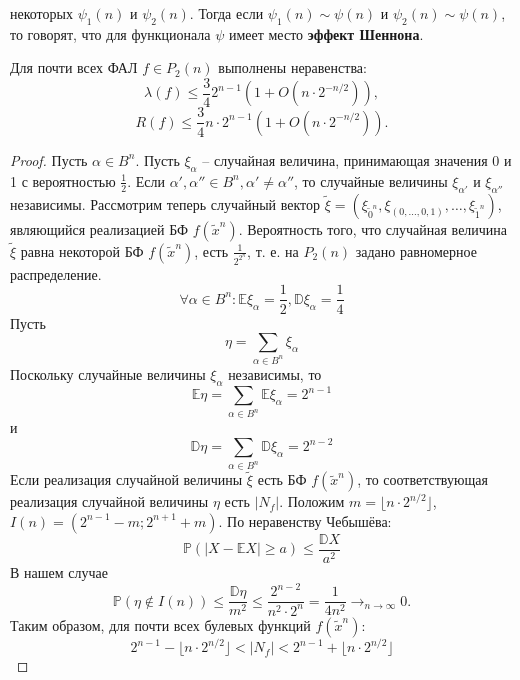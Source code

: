 \documentclass[11pt]{article}
\newcounter{th}\setcounter{th}{0}
\newcounter{stnmt}\setcounter{stnmt}{0}
\def\st{\par\smallskip\refstepcounter{stnmt}\textbf{\arabic{stnmt}}}
\newtheorem*{Statement}{Утверждение \st}
\begin{document}
некоторых $\psi_1(n)$ и $\psi_2(n)$. Тогда если $\psi_1(n) \sim \psi(n)$ и
$\psi_2(n) \sim \psi(n)$, то говорят, что для функционала $\psi$ имеет место \textbf{эффект Шеннона}.
\begin{Statement}
Для почти всех ФАЛ $f \in P_2(n)$ выполнены неравенства:
\begin{equation*}
\lambda(f) \leq \frac342^{n - 1}(1 + O(n\cdot2^{-n/2})),
\end{equation*}
\begin{equation*}
R(f) \leq \frac34n\cdot2^{n - 1}(1 + O(n\cdot2^{-n/2})).
\end{equation*}
\end{Statement}
\begin{proof}
Пусть $\alpha \in B^n$. Пусть $\xi_{\alpha}$ -- случайная величина, принимающая значения 0 и 1 с
вероятностью $\frac12$. Если $\alpha', \alpha'' \in B^n, \alpha' \neq \alpha''$, то случайные
величины $\xi_{\alpha'}$ и $\xi_{\alpha''}$ независимы. Рассмотрим теперь случайный вектор
$\tilde{\xi} = (\xi_{\tilde{0}^n}, \xi_{(0, \ldots, 0, 1)}, \ldots, \xi_{\tilde{1}^n})$,
являющийся реализацией БФ $f(\tilde{x}^n)$. Вероятность того, что случайная величина $\tilde{\xi}$
равна некоторой БФ $f(\tilde{x}^n)$, есть $\frac1{2^{2^n}}$, т. е. на $P_2(n)$ задано равномерное
распределение.
\begin{equation*}
\forall \alpha \in B^n: \mathbb{E}\xi_{\alpha} = \frac12, \mathbb{D}\xi_{\alpha} = \frac14
\end{equation*}
Пусть
\begin{equation*}
\eta = \sum_{\alpha \in B^n}\xi_{\alpha}
\end{equation*}
Поскольку случайные величины $\xi_{\alpha}$ независимы, то
\begin{equation*}
\mathbb{E}\eta = \sum_{\alpha \in B^n}\mathbb{E}\xi_{\alpha} = 2^{n - 1}
\end{equation*}
и
\begin{equation*}
\mathbb{D}\eta = \sum_{\alpha \in B^n}\mathbb{D}\xi_{\alpha} = 2^{n - 2}
\end{equation*}
Если реализация случайной величины $\tilde{\xi}$ есть БФ $f(\tilde{x}^n)$, то соответствующая
реализация случайной величины $\eta$ есть $|N_f|$. Положим $m = \lfloor n\cdot2^{n/2}\rfloor$,
$I(n) = (2^{n - 1} - m; 2^{n + 1} + m)$.
По неравенству Чебышёва:
\begin{equation*}
\mathbb{P}(|X - \mathbb{E}X| \geq a) \leq \frac{\mathbb{D}X}{a^2}
\end{equation*}
В нашем случае
\begin{equation*}
\mathbb{P}(\eta \notin I(n)) \leq \frac{\mathbb{D}\eta}{m^2} \leq \frac{2^{n - 2}}{n^2\cdot2^n} =
\frac1{4n^2} \to_{n \to \infty} 0.
\end{equation*}
Таким образом, для почти всех булевых функций $f(\tilde{x}^n)$:
\begin{equation*}
2^{n - 1} - \lfloor n\cdot2^{n/2}\rfloor < |N_f| < 2^{n - 1} + \lfloor n\cdot2^{n/2}\rfloor
\end{equation*}
\end{proof}
\end{document}
